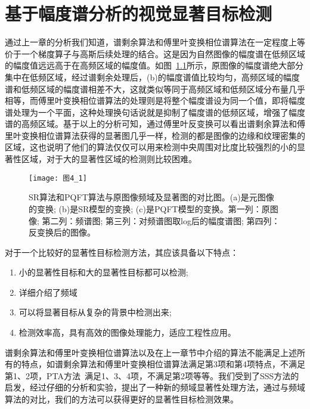 
\chapter{基于幅度谱分析的视觉显著目标检测}
\label{cha4}

通过上一章的分析我们知道，谱剩余算法\cite{HouXiaodiCVPR2007Residual}和傅里叶变换相位谱算法\cite{GuoChenleiCVPR2008Spatio}在一定程度上等价于一个梯度算子与高斯后续处理的结合。这是因为自然图像的幅度谱在低频区域的幅度值远远高于在高频区域的幅度值。如图~\ref{图4_1}所示，原图像的幅度谱绝大部分集中在低频区域，经过谱剩余处理后，(b)的幅度谱值比较均匀，高频区域的幅度谱和低频区域的幅度谱相差不大，这就类似等同于高频区域和低频区域分布量几乎相等，而傅里叶变换相位谱算法的处理则是将整个幅度谱设为同一个值，即将幅度谱处理为一个平面，这种处理换句话说就是抑制了幅度谱的低频区域，增强了幅度谱的高频区域。基于以上的分析可知，通过傅里叶反变换可以看出谱剩余算法和傅里叶变换相位谱算法获得的显著图几乎一样，检测的都是图像的边缘和纹理密集的区域，这也说明了他们的算法仅仅可以用来检测中央周围对比度比较强烈的小的显著性区域，对于大的显著性区域的检测则比较困难。
\begin{figure}[h]
  \centering
  \texttt{[image: 图4\_1]}
  \caption{SR算法和PQFT算法与原图像频域及显著图的对比图。(a)是元图像的变换; (b)是SR模型的变换; (c)是PQFT模型的变换。第一列：原图像; 第二列：频谱图; 第三列：对频谱图取log后的幅度谱图; 第四列：反变换后的图像。}
  \label{图4_1}    
\end{figure}
对于一个比较好的显著性目标检测方法，其应该具备以下特点\cite{AchantaCVPR2009Frequency}：
\begin{enumerate}
\item 小的显著性目标和大的显著性目标都可以检测;
\item 详细介绍了频域
\item 可以将显著目标从复杂的背景中检测出来;
\item 检测效率高，具有高效的图像处理能力，适应工程性应用。
\end{enumerate}

谱剩余算法和傅里叶变换相位谱算法以及在上一章节中介绍的算法不能满足上述所有的特点，如谱剩余算法\cite{HouXiaodiCVPR2007Residual}和傅里叶变换相位谱算法\cite{GuoChenleiCVPR2008Spatio}满足第3项和第4项特点，不满足第1、2项，PTA方法~\cite{李崇飞2012相位谱}满足1、3、4项，不满足第2项等等。我们受到了SSS方法的启发，经过仔细的分析和实验，提出了一种新的频域显著性处理方法，通过与频域算法的对比，我们的方法可以获得更好的显著性目标检测效果。

